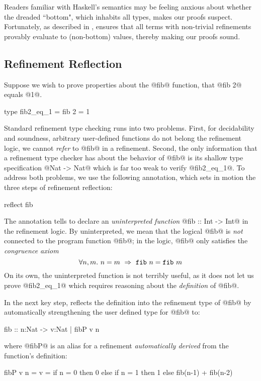  Readers familiar with Haskell's
semantics may be feeling anxious about whether the
dreaded ``bottom", which inhabits all types, makes our
proofs suspect.
%
Fortunately, as described in \cite{Vazou14}, \toolname
ensures that all terms with non-trivial refinements
provably evaluate to (non-bottom) values, thereby making
our proofs sound.

\subsection{Refinement Reflection}

Suppose we wish to prove properties about the @fib@
function, \eg that @fib 2@ equals @1@.
%
\begin{code}
  type fib2_eq_1 = { fib 2 = 1 }
\end{code}
%
Standard refinement type checking runs into two problems.
%
First, for decidability and soundness, arbitrary user-defined
functions do not belong the refinement logic, \ie we cannot
\emph{refer} to @fib@ in a refinement.
%
Second, the only information that a refinement type checker
has about the behavior of @fib@ is its shallow type
specification @Nat -> Nat@ which is far too weak to verify
@fib2_eq_1@.
%
To address both problems, we use the following annotation,
which sets in motion the three steps of refinement reflection:
%
\begin{code}
  reflect fib
\end{code}

%
The annotation tells \toolname to declare an
\emph{uninterpreted function} @fib :: Int -> Int@
in the refinement logic.
%
By uninterpreted, we mean that the logical @fib@
is \emph{not} connected to the program function
@fib@; in the logic, @fib@
only satisfies the \emph{congruence axiom}
%
$$\forall n, m.\ n = m\ \Rightarrow\ \fib{n} = \fib{m}$$
%
On its own, the uninterpreted function is not
terribly useful, as it does not let us prove
%
@fib2_eq_1@ which requires reasoning about the
\emph{definition} of @fib@.

%
In the next key step, \toolname reflects the
definition into the refinement type of @fib@
by automatically strengthening the user defined
type for @fib@ to:
%
\begin{code}
  fib :: n:Nat -> { v:Nat | fibP v n }
\end{code}
%
where @fibP@ is an alias for a refinement
\emph{automatically derived} from the
function's definition:
%
\begin{mcode}
  fibP v n = v = if n = 0 then 0 else
                 if n = 1 then 1 else
                 fib(n-1) + fib(n-2)
\end{mcode}

